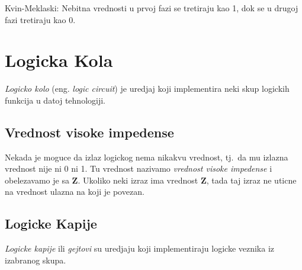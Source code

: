\documentclass[12p,a4paper]{article}
\begin{document}
\begin{multicols}{2}
    Kvin-Meklaski: Nebitna vrednosti u prvoj fazi se tretiraju kao 1, dok
    se u drugoj fazi tretiraju kao 0.
    
    \section{Logicka Kola}
    
    \emph{Logicko kolo} (eng. \emph{logic circuit}) je uredjaj koji 
    implementira neki skup logickih funkcija u datoj tehnologiji.

    \subsection{Vrednost visoke impedense}
    
    Nekada je moguce da izlaz logickog nema nikakvu vrednost, tj.\ da mu
    izlazna vrednost nije ni 0 ni 1. Tu vrednost nazivamo 
    \emph{vrednost visoke impedense} i obelezavamo je sa $\mathbf{Z}$. Ukoliko
    neki izraz ima vrednost $\mathbf{Z}$, tada taj izraz ne uticne na 
    vrednost ulazna na koji je povezan.

    \subsection{Logicke Kapije}

    \emph{Logicke kapije} ili \emph{gejtovi} su uredjaju koji implementiraju 
    logicke veznika iz izabranog skupa.


\end{multicols}
\end{document}
